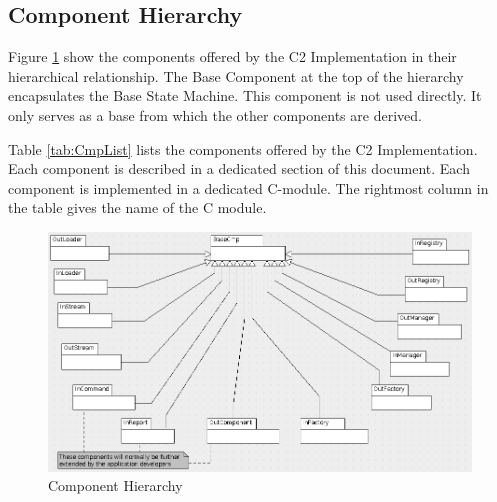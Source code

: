 \documentclass[a4paper,10pt]{article}
\begin{document}
\subsection{Component Hierarchy}\label{sec:CmpHierarchy} 
Figure \ref{fig:CmpHierarchy} show the components offered by the C2 Implementation in their hierarchical relationship. The Base Component at the top of the hierarchy encapsulates the Base State Machine. This component is not used directly. It only serves as a base from which the other components are derived.

Table \ref{tab:CmpList} lists the components offered by the C2 Implementation. Each component is described in a dedicated section of this document. Each component is implemented in a dedicated C-module. The rightmost column in the table gives the name of the C module.

\begin{figure}[H]
 \centering
 \includegraphics[scale=0.37,keepaspectratio=true]{CmpHierarchy.png}
 \caption{Component Hierarchy}
 \label{fig:CmpHierarchy}
\end{figure}
\end{document}
